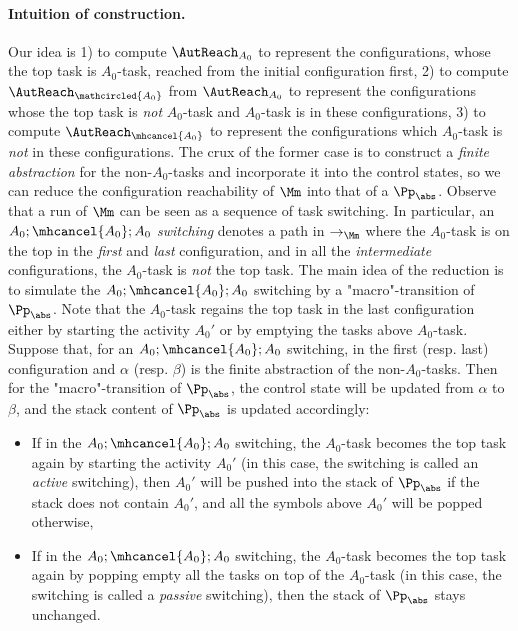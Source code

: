 \paragraph{Intuition of construction.} Our idea is 1) to compute $\AutReach_{A_0}$ to represent the configurations, whose the top task is $A_0$-task, reached from the initial configuration first, 2) to compute $\AutReach_{\mathcircled{A_0}}$ from $\AutReach_{A_0}$ to represent the configurations whose the top task is \emph{not} $A_0$-task and $A_0$-task is in these configurations, 3) to compute $\AutReach_{\mhcancel{A_0}}$ to represent the configurations which $A_0$-task is \emph{not} in these configurations.
The crux of the former case is to construct a \emph{finite abstraction} for the non-$A_0$-tasks and incorporate it into the control states, so we can reduce the configuration reachability of $\Mm$ into that of a {\WOTrPDS} $\Pp_{\abs}$. Observe that a run of $\Mm$ can be seen as a sequence of task switching. In particular, an $A_0;\mhcancel{A_0};A_0$ \emph{switching} denotes a path in $\rightarrow_{\Mm}$ where the $A_0$-task is on the top in the \emph{first} and \emph{last} configuration, and in all the \emph{intermediate} configurations, the $A_0$-task is \emph{not} the top task. The main idea of the reduction is to simulate the $A_0;\mhcancel{A_0};A_0$ switching by a "macro"-transition of $\Pp_{\abs}$. Note that the $A_0$-task regains the top task in the last configuration either by starting the activity $A_0'$ or by emptying the tasks above $A_0$-task. Suppose that, for an $A_0;\mhcancel{A_0};A_0$ switching, in the first (resp. last) configuration and $\alpha$ (resp. $\beta$) is the finite abstraction of the non-$A_0$-tasks. Then for the "macro"-transition of $\Pp_{\abs}$, the control state will be updated from $\alpha$ to $\beta$, and the stack content of $\Pp_{\abs}$ is updated accordingly:
\begin{itemize}
    \item If in the $A_0; \mhcancel{A_0}; A_0$ switching, the $A_0$-task becomes the top task again by starting the activity $A_0'$  (in this case, the switching is called an \emph{active} switching), then $A_0'$ will be pushed into the stack of  $\Pp_{\abs}$ if the stack does not contain $A_0'$, and all the symbols above $A_0'$ will be popped otherwise,
%
    \item If in the $A_0; \mhcancel{A_0}; A_0$ switching, the $A_0$-task becomes the top task again by popping empty all the tasks on top of the $A_0$-task (in this case, the switching is called a \emph{passive} switching), then the stack of $\Pp_{\abs}$ stays unchanged.
        
\end{itemize}
